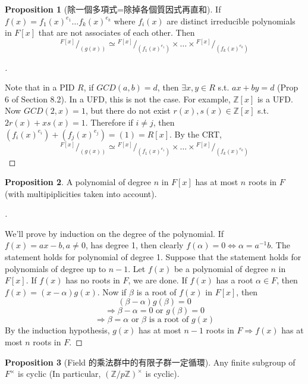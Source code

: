 \documentclass[12pt]{article}
\theoremstyle{definition}
\newtheorem{prop}{Proposition}
\newenvironment{proofs}[1][\proofname]{%
  \begin{proof}[#1]$ $\par\nobreak\ignorespaces
}{%
  \end{proof}
}
\newcommand*\quot[2]{{^{\textstyle #1}\big/_{\textstyle #2}}}
\begin{document}


\begin{prop}[除一個多項式=除掉各個質因式再直和]
	If $f(x) =f_1(x)^{e_1} \hdots f_k(x)^{e_k}$ where $f_i(x)$ are distinct irreducible polynomials in $F[x]$ that are not associates of each other. Then
	\[
		\quot{F[x]}{(g(x))} \simeq \quot{F[x]}{(f_1(x)^{e_1})} \times \hdots \times \quot{F[x]}{(f_k(x)^{e_k})}
	\]
\end{prop}

\begin{proofs}
	Note that in a PID $R$, if $GCD(a, b) = d$, then $\exists x, y \in R$ s.t. $ax + by = d$ (Prop 6 of Section 8.2). In a UFD, this is not the case. For example, $\mathbb{Z}[x]$ is a UFD. Now $GCD(2, x) = 1$, but there do not exist $r(x), s(x) \in \mathbb{Z}[x]$ s.t. $2r(x) + xs(x) = 1$. Therefore if $i \neq j$, then $(f_i(x)^{e_i}) + (f_j(x)^{e_j}) = (1) = R[x]$. By the CRT,
	\[
		\quot{F[x]}{(g(x))} \simeq \quot{F[x]}{(f_1(x)^{e_1})} \times \hdots \times \quot{F[x]}{(f_k(x)^{e_k})}
	\]
\end{proofs}

\begin{prop}
	A polynomial of degree $n$ in $F[x]$ has at most $n$ roots in $F$ (with multipiplicities taken into account).
\end{prop}

\begin{proofs}
	We'll prove by induction on the degree of the polynomial. If $f(x) = ax - b, a \neq 0$, has degree 1, then clearly $f(\alpha) = 0 \Leftrightarrow \alpha = a^{-1} b$. The statement holds for polynomial of degree 1. Suppose that the statement holds for polynomials of degree up to $n - 1$. Let $f(x)$ be a polynomial of degree $n$ in $F[x]$. If $f(x)$ has no roots in $F$, we are done. If $f(x)$ has a root $\alpha \in F$, then $f(x) = (x - \alpha) g(x)$. Now if $\beta$ is a root of $f(x)$ in $F[x]$, then
	\[
		(\beta - \alpha) g(\beta) = 0
	\]
	\[
		\Rightarrow \beta - \alpha = 0 \text{ or } g(\beta) = 0
	\]
	\[
		\Rightarrow \beta = \alpha \text{ or } \beta \text{ is a root of } g(x)
	\]
	By the induction hypothesis, $g(x)$ has at most $n - 1$ roots in $F \Rightarrow f(x)$ has at most $n$ roots in $F$.
\end{proofs}

\begin{prop}[Field 的乘法群中的有限子群一定循環]
	Any finite subgroup of $F^\times$ is cyclic (In particular, $(\mathbb{Z}/p\mathbb{Z})^\times$ is cyclic).
\end{prop}
\end{document}
